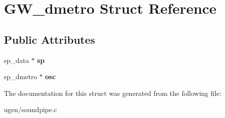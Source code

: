 \hypertarget{structGW__dmetro}{}\section{G\+W\+\_\+dmetro Struct Reference}
\label{structGW__dmetro}
\subsection*{Public Attributes}
\begin{DoxyCompactItemize}
\item 
\hypertarget{structGW__dmetro_aef273c366d4c5669d5263ba6585a42e7}{}\label{structGW__dmetro_aef273c366d4c5669d5263ba6585a42e7} 
sp\+\_\+data $\ast$ {\bfseries sp}
\item 
\hypertarget{structGW__dmetro_a79ed6ebb36010259d545919544af1e92}{}\label{structGW__dmetro_a79ed6ebb36010259d545919544af1e92} 
sp\+\_\+dmetro $\ast$ {\bfseries osc}
\end{DoxyCompactItemize}


The documentation for this struct was generated from the following file\+:\begin{DoxyCompactItemize}
\item 
ugen/soundpipe.\+c\end{DoxyCompactItemize}
